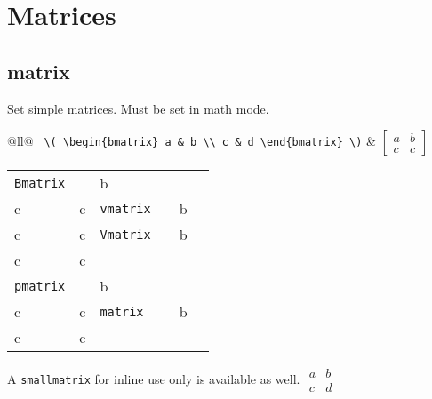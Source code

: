 \documentclass[draft]{cheatsht}
\begin{document}
\section{Matrices}
\subsection{matrix}
Set simple matrices. Must be set in math mode.\\
\begin{tabular}{@{}ll@{}}
  \verb! \( \begin{bmatrix} a & b \\ c & d \end{bmatrix} \)!
    & \hspace{-4pt}\(\begin{bmatrix} a & b \\ c & c \end{bmatrix}\) \vspace{4pt}
\end{tabular}
\begin{tabular}{@{}llllll@{}}
  \verb!Bmatrix! & \(\begin{Bmatrix} a & b \\ c & c \end{Bmatrix}\) &
  \verb!vmatrix! & \(\begin{vmatrix} a & b \\ c & c \end{vmatrix}\) &
  \verb!Vmatrix! & \(\begin{Vmatrix} a & b \\ c & c \end{Vmatrix}\)
    \vspace{4pt}\\
  \verb!pmatrix! & \(\begin{pmatrix} a & b \\ c & c \end{pmatrix}\) &
  \verb!matrix! & \(\begin{matrix} a & b \\ c & c \end{matrix}\) \vspace{4pt}
\end{tabular}

A \verb!smallmatrix! for inline use only is available as well.
\(\begin{smallmatrix}a & b \\ c & d \end{smallmatrix}\)
\end{document}
